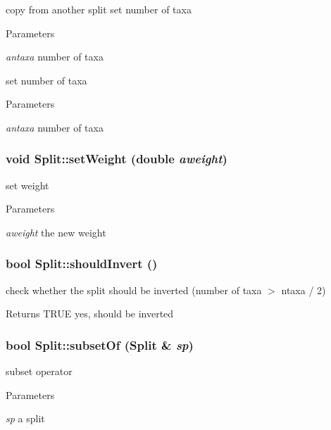 \label{classSplit_a2d5be14eadb830619216ef12ddd512e7}
copy from another split set number of taxa 
\begin{DoxyParams}{Parameters}
\item[{\em antaxa}]number of taxa\end{DoxyParams}
set number of taxa 
\begin{DoxyParams}{Parameters}
\item[{\em antaxa}]number of taxa \end{DoxyParams}
\hypertarget{classSplit_a4c2f157bcf99e1522415915bb6823bb9}{
\subsubsection[{setWeight}]{\setlength{\rightskip}{0pt plus 5cm}void Split::setWeight (double {\em aweight})}}
\label{classSplit_a4c2f157bcf99e1522415915bb6823bb9}
set weight 
\begin{DoxyParams}{Parameters}
\item[{\em aweight}]the new weight \end{DoxyParams}
\hypertarget{classSplit_a1e801d80a5667c140ee3f1ebe0137f07}{
\subsubsection[{shouldInvert}]{\setlength{\rightskip}{0pt plus 5cm}bool Split::shouldInvert ()}}
\label{classSplit_a1e801d80a5667c140ee3f1ebe0137f07}
check whether the split should be inverted (number of taxa $>$ ntaxa / 2) \begin{DoxyReturn}{Returns}
TRUE yes, should be inverted 
\end{DoxyReturn}
\hypertarget{classSplit_a724c4b8226835191fb058048f5a5aff3}{
\subsubsection[{subsetOf}]{\setlength{\rightskip}{0pt plus 5cm}bool Split::subsetOf ({\bf Split} \& {\em sp})}}
\label{classSplit_a724c4b8226835191fb058048f5a5aff3}
subset operator 
\begin{DoxyParams}{Parameters}
\item[{\em sp}]a split \end{DoxyParams}
